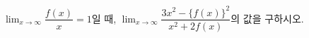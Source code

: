 $\displaystyle\lim_{x\to\infty}\dfrac{f(x)}{x}=1$일 때, $\displaystyle\lim_{x\to\infty}\dfrac{3x^2-\{f(x)\}^2}{x^2+2f(x)}$의 값을 구하시오.
